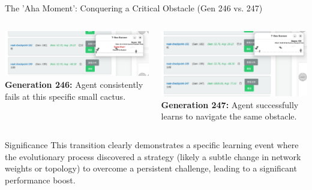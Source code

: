 \documentclass{beamer}
\begin{document}
\begin{frame}{The 'Aha Moment': Conquering a Critical Obstacle (Gen 246 vs. 247)}
    \begin{columns}[T]
        \begin{column}{0.5\textwidth}
            \centering
            \includegraphics[width=0.9\linewidth]{media/gen246_stuck_cactus.png} %
            \tiny \textbf{Generation 246:} Agent consistently fails at this specific small cactus.
        \end{column}
        \begin{column}{0.5\textwidth}
            \centering
            \includegraphics[width=0.9\linewidth]{media/gen247_pass_cactus.png} %
            \tiny \textbf{Generation 247:} Agent successfully learns to navigate the same obstacle.
        \end{column}
    \end{columns}
    \vspace{0.5cm}
    \begin{block}{Significance}
        This transition clearly demonstrates a specific learning event where the evolutionary process discovered a strategy (likely a subtle change in network weights or topology) to overcome a persistent challenge, leading to a significant performance boost.
    \end{block}
\end{frame}
\end{document}
